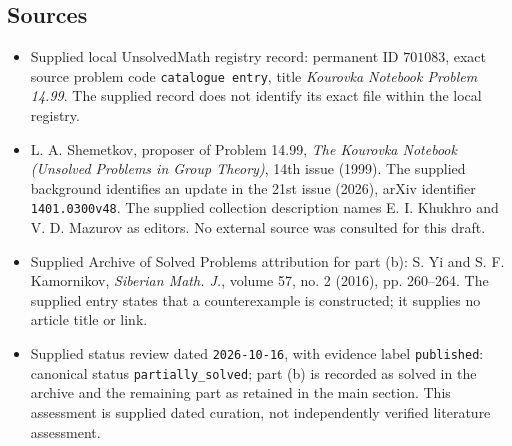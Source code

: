 \documentclass[11pt]{article}
\begin{document}
\subsection{Sources}
\begin{itemize}
\item Supplied local UnsolvedMath registry record: permanent ID \(701083\), exact source problem code \texttt{catalogue entry}, title \emph{Kourovka Notebook Problem 14.99}. The supplied record does not identify its exact file within the local registry.
\item L. A. Shemetkov, proposer of Problem 14.99, \emph{The Kourovka Notebook (Unsolved Problems in Group Theory)}, 14th issue (1999). The supplied background identifies an update in the 21st issue (2026), arXiv identifier \texttt{1401.0300v48}. The supplied collection description names E. I. Khukhro and V. D. Mazurov as editors. No external source was consulted for this draft.
\item Supplied Archive of Solved Problems attribution for part (b): S. Yi and S. F. Kamornikov, \emph{Siberian Math. J.}, volume 57, no. 2 (2016), pp. 260--264. The supplied entry states that a counterexample is constructed; it supplies no article title or link.
\item Supplied status review dated \texttt{2026-10-16}, with evidence label \texttt{published}: canonical status \texttt{partially\_solved}; part (b) is recorded as solved in the archive and the remaining part as retained in the main section. This assessment is supplied dated curation, not independently verified literature assessment.
\end{itemize}
\end{document}
